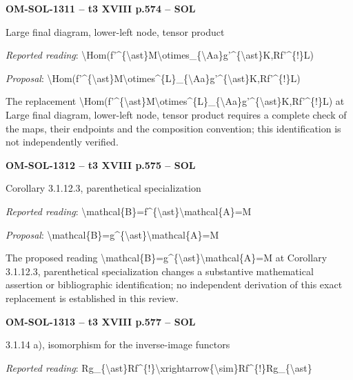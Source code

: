 \par\noindent\textbf{OM-SOL-1311 -- t3 XVIII p.574 -- SOL}\par
Large final diagram, lower-left node, tensor product\par
\emph{Reported reading}: \textbackslash{}Hom(f'\textasciicircum{}\{\textbackslash{}ast\}M\textbackslash{}otimes\_\{\textbackslash{}Aa\}g'\textasciicircum{}\{\textbackslash{}ast\}K,Rf'\textasciicircum{}\{!\}L)\par
\emph{Proposal}: \textbackslash{}Hom(f'\textasciicircum{}\{\textbackslash{}ast\}M\textbackslash{}otimes\textasciicircum{}\{L\}\_\{\textbackslash{}Aa\}g'\textasciicircum{}\{\textbackslash{}ast\}K,Rf'\textasciicircum{}\{!\}L)\par
The replacement \textbackslash{}Hom(f'\textasciicircum{}\{\textbackslash{}ast\}M\textbackslash{}otimes\textasciicircum{}\{L\}\_\{\textbackslash{}Aa\}g'\textasciicircum{}\{\textbackslash{}ast\}K,Rf'\textasciicircum{}\{!\}L) at Large final diagram, lower-left node, tensor product requires a complete check of the maps, their endpoints and the composition convention; this identification is not independently verified.\par
\par\noindent\textbf{OM-SOL-1312 -- t3 XVIII p.575 -- SOL}\par
Corollary 3.1.12.3, parenthetical specialization\par
\emph{Reported reading}: \textbackslash{}mathcal\{B\}=\allowbreak f\textasciicircum{}\{\textbackslash{}ast\}\textbackslash{}mathcal\{A\}=\allowbreak M\par
\emph{Proposal}: \textbackslash{}mathcal\{B\}=\allowbreak g\textasciicircum{}\{\textbackslash{}ast\}\textbackslash{}mathcal\{A\}=\allowbreak M\par
The proposed reading \textbackslash{}mathcal\{B\}=\allowbreak g\textasciicircum{}\{\textbackslash{}ast\}\textbackslash{}mathcal\{A\}=\allowbreak M at Corollary 3.1.12.3, parenthetical specialization changes a substantive mathematical assertion or bibliographic identification; no independent derivation of this exact replacement is established in this review.\par
\par\noindent\textbf{OM-SOL-1313 -- t3 XVIII p.577 -- SOL}\par
3.1.14 a), isomorphism for the inverse-image functors\par
\emph{Reported reading}: Rg\_\{\textbackslash{}ast\}Rf\textasciicircum{}\{!\}\textbackslash{}xrightarrow\{\textbackslash{}sim\}Rf\textasciicircum{}\{!\}Rg\_\{\textbackslash{}ast\}\par
